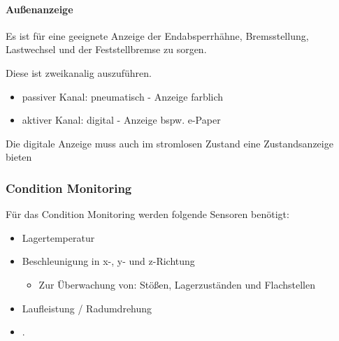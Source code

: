 \paragraph{Außenanzeige}
\begin{feat}
Es ist für eine geeignete Anzeige der Endabsperrhähne, Bremsstellung, \gls{Lastwechsel} und der Feststellbremse zu sorgen.
\end{feat}
\begin{rem}[zu Anf. 25]
Diese ist zweikanalig auszuführen.
\begin{itemize}
    \item passiver Kanal: pneumatisch - Anzeige farblich
    \item aktiver Kanal: digital - Anzeige bspw. e-Paper
\end{itemize}
\end{rem}
\begin{feat}
Die digitale Anzeige muss auch im stromlosen Zustand eine Zustandsanzeige bieten
\end{feat}

\subsubsection{Condition Monitoring}
\begin{feat}
Für das Condition Monitoring werden folgende Sensoren benötigt:
\begin{itemize}
    \item Lagertemperatur
    \item Beschleunigung in x-, y- und z-Richtung
    \begin{itemize}
        \item Zur Überwachung von: Stößen, Lagerzuständen und Flachstellen
    \end{itemize}
    \item Laufleistung / Radumdrehung
    \item .
\end{itemize}
\end{feat}

\begin{comment}
\subsubsection{Sonstige Sensoren}
\begin{feat}
Weitere Benötigte Sensoren:
\begin{itemize}
    \item 
\end{itemize}
\end{feat}
\end{comment}


